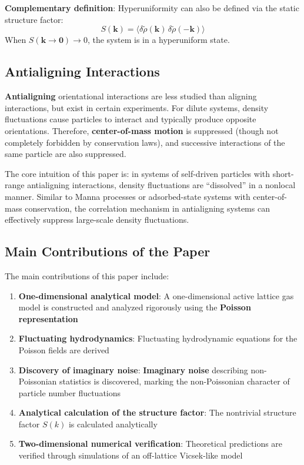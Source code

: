 \textbf{Complementary definition}: Hyperuniformity can also be defined via the static structure factor:
\begin{equation}\label{eq:structure-factor-def}
S(\mathbf{k}) = \langle \delta\tilde{\rho}(\mathbf{k})\, \delta\tilde{\rho}(-\mathbf{k}) \rangle
\end{equation}
When $S(\mathbf{k} \to \mathbf{0}) \to 0$, the system is in a hyperuniform state.

\subsection{Antialigning Interactions}

\textbf{Antialigning} orientational interactions are less studied than aligning interactions, but exist in certain experiments\cite{boltz2025}. For dilute systems, density fluctuations cause particles to interact and typically produce opposite orientations. Therefore, \textbf{center-of-mass motion} is suppressed (though not completely forbidden by conservation laws), and successive interactions of the same particle are also suppressed.

\begin{notebox}
The core intuition of this paper is: in systems of self-driven particles with short-range antialigning interactions, density fluctuations are ``dissolved'' in a nonlocal manner. Similar to Manna processes or adsorbed-state systems with center-of-mass conservation, the correlation mechanism in antialigning systems can effectively suppress large-scale density fluctuations.
\end{notebox}

\subsection{Main Contributions of the Paper}

The main contributions of this paper include:

\begin{enumerate}
    \item \textbf{One-dimensional analytical model}: A one-dimensional active lattice gas model is constructed and analyzed rigorously using the \textbf{Poisson representation}
    \item \textbf{Fluctuating hydrodynamics}: Fluctuating hydrodynamic equations for the Poisson fields are derived
    \item \textbf{Discovery of imaginary noise}: \textbf{Imaginary noise} describing non-Poissonian statistics is discovered, marking the non-Poissonian character of particle number fluctuations
    \item \textbf{Analytical calculation of the structure factor}: The nontrivial structure factor $S(k)$ is calculated analytically
    \item \textbf{Two-dimensional numerical verification}: Theoretical predictions are verified through simulations of an off-lattice Vicsek-like model
\end{enumerate}

